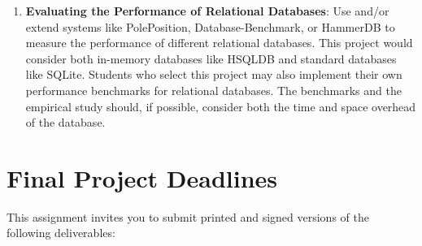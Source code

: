 \begin{enumerate}

  \item {\bf Evaluating the Performance of Relational Databases}: Use and/or extend systems like PolePosition,
    Database-Benchmark, or HammerDB to measure the performance of different relational databases.  This project would
    consider both in-memory databases like HSQLDB and standard databases like SQLite.  Students who select this project
    may also implement their own performance benchmarks for relational databases.  The benchmarks and
    the empirical study should, if possible, consider both the time and space overhead of the database.








    
\end{enumerate} 



\section*{Final Project Deadlines}

This assignment invites you to submit printed and signed versions of the following deliverables: 

